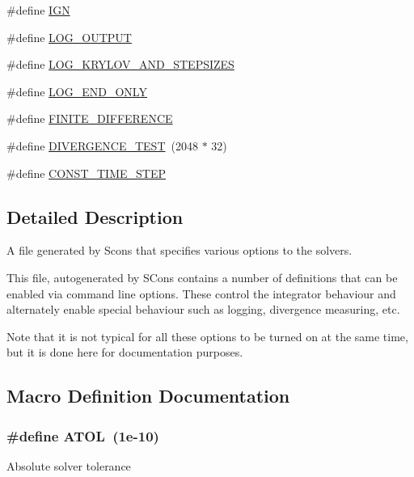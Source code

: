 \begin{DoxyCompactItemize}
\item 
\#define \hyperlink{solver__options_8cuh_af5cccef89d39980a452b7f3a7c59fb53}{I\+GN}
\item 
\#define \hyperlink{solver__options_8cuh_ac786f5f1963363a48eed565f7cbc6931}{L\+O\+G\+\_\+\+O\+U\+T\+P\+UT}
\item 
\#define \hyperlink{solver__options_8cuh_a2adffa059bbd6f183ff7f63db602ac42}{L\+O\+G\+\_\+\+K\+R\+Y\+L\+O\+V\+\_\+\+A\+N\+D\+\_\+\+S\+T\+E\+P\+S\+I\+Z\+ES}
\item 
\#define \hyperlink{solver__options_8cuh_a09cc461392fae3949d88392adf655db5}{L\+O\+G\+\_\+\+E\+N\+D\+\_\+\+O\+N\+LY}
\item 
\#define \hyperlink{solver__options_8cuh_a9e28db46fb24c2d46dbfe205c6a11236}{F\+I\+N\+I\+T\+E\+\_\+\+D\+I\+F\+F\+E\+R\+E\+N\+CE}
\item 
\#define \hyperlink{solver__options_8cuh_afd8c973bc66908100d15f47ae514ed41}{D\+I\+V\+E\+R\+G\+E\+N\+C\+E\+\_\+\+T\+E\+ST}~(2048 $\ast$ 32)
\item 
\#define \hyperlink{solver__options_8cuh_a66c8290aad471b0be7768f635f03c349}{C\+O\+N\+S\+T\+\_\+\+T\+I\+M\+E\+\_\+\+S\+T\+EP}
\end{DoxyCompactItemize}


\subsection{Detailed Description}
A file generated by Scons that specifies various options to the solvers. 

This file, autogenerated by S\+Cons contains a number of definitions that can be enabled via command line options. These control the integrator behaviour and alternately enable special behaviour such as logging, divergence measuring, etc.

Note that it is not typical for all these options to be turned on at the same time, but it is done here for documentation purposes. 

\subsection{Macro Definition Documentation}
\subsubsection[{\texorpdfstring{A\+T\+OL}{ATOL}}]{\setlength{\rightskip}{0pt plus 5cm}\#define A\+T\+OL~(1e-\/10)}\hypertarget{solver__options_8cuh_a29a15cd00b37b1f4a5b4ec9f07c742f4}{}\label{solver__options_8cuh_a29a15cd00b37b1f4a5b4ec9f07c742f4}
Absolute solver tolerance 
